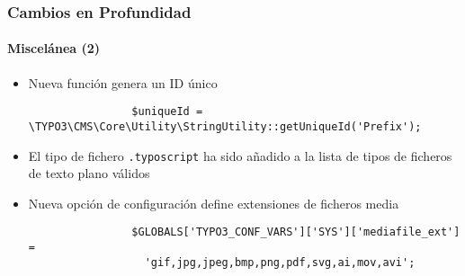 \begin{frame}[fragile]
	\frametitle{Cambios en Profundidad}
	\framesubtitle{Miscelánea (2)}


	\begin{itemize}

		\item Nueva función genera un ID único

			\begin{lstlisting}
				$uniqueId = \TYPO3\CMS\Core\Utility\StringUtility::getUniqueId('Prefix');
			\end{lstlisting}

		\item El tipo de fichero \texttt{.typoscript} ha sido añadido a la lista de tipos de ficheros de texto plano válidos

		\item Nueva opción de configuración define extensiones de ficheros media

			\begin{lstlisting}
				$GLOBALS['TYPO3_CONF_VARS']['SYS']['mediafile_ext'] =
				  'gif,jpg,jpeg,bmp,png,pdf,svg,ai,mov,avi';
			\end{lstlisting}

	\end{itemize}

	\breakingchange

\end{frame}

